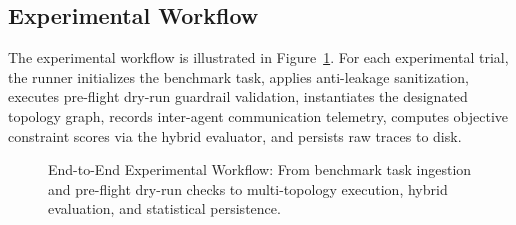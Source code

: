 \subsection{Experimental Workflow}
The experimental workflow is illustrated in Figure~\ref{fig:experimental_workflow}. For each experimental trial, the runner initializes the benchmark task, applies anti-leakage sanitization, executes pre-flight dry-run guardrail validation, instantiates the designated topology graph, records inter-agent communication telemetry, computes objective constraint scores via the hybrid evaluator, and persists raw traces to disk.

\begin{figure}[t]
\centering

\caption{End-to-End Experimental Workflow: From benchmark task ingestion and pre-flight dry-run checks to multi-topology execution, hybrid evaluation, and statistical persistence.}
\label{fig:experimental_workflow}
\end{figure}

